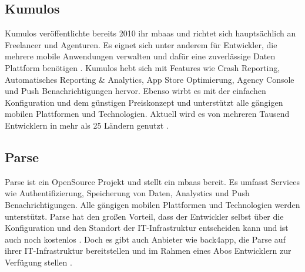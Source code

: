 \subsection{Kumulos}
Kumulos veröffentlichte bereits 2010 ihr \gls{mbaas} und richtet sich hauptsächlich an Freelancer und Agenturen. Es eignet sich unter anderem für Entwickler, die mehrere mobile Anwendungen verwalten und dafür eine zuverlässige Daten Plattform benötigen \cite{canival}. Kumulos hebt sich mit Features wie Crash Reporting, Automatisches Reporting \& Analytics, App Store Optimierung, Agency Console und Push Benachrichtigungen hervor. Ebenso wirbt es mit der einfachen Konfiguration und dem günstigen Preiskonzept und unterstützt alle gängigen mobilen Plattformen und Technologien. Aktuell wird es von mehreren Tausend Entwicklern in mehr als 25 Ländern genutzt \cite{kumulos}.

\subsection{Parse}
Parse ist ein OpenSource Projekt und stellt ein \gls{mbaas} bereit. Es umfasst Services wie Authentifizierung, Speicherung von Daten, Analystics und Push Benachrichtigungen. Alle gängigen mobilen Plattformen und Technologien werden unterstützt. Parse hat den großen Vorteil, dass der Entwickler selbst über die Konfiguration und den Standort der IT-Infrastruktur entscheiden kann und ist auch noch kostenlos \cite{parse}. Doch es gibt auch Anbieter wie back4app, die Parse auf ihrer IT-Infrastruktur bereitstellen und im Rahmen eines Abos Entwicklern zur Verfügung stellen \cite{back4app}. 
